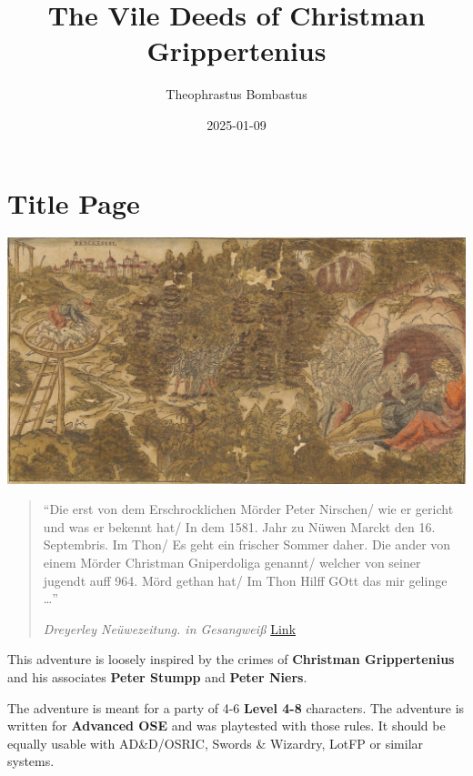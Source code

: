 \documentclass[
]{book}
\title{The Vile Deeds of Christman Grippertenius}
\author{Theophrastus Bombastus}
\date{2025-01-09}
\begin{document}
\maketitle

{
\setcounter{tocdepth}{1}
\tableofcontents
}
\chapter*{Title Page}\label{title-page}

\begin{center}\includegraphics[width=1.2\linewidth]{graphics/wiki_Christeman} \end{center}

\begin{quote}
``Die erst von dem Erschrocklichen Mörder Peter Nirschen/ wie er gericht und was er bekennt hat/ In dem 1581. Jahr zu Nüwen Marckt den 16. Septembris. Im Thon/ Es geht ein frischer Sommer daher. Die ander von einem Mörder Christman Gniperdoliga genannt/ welcher von seiner jugendt auff 964. Mörd gethan hat/ Im Thon Hilff GOtt das mir gelinge \ldots{}''

\emph{Dreyerley Neüwezeitung. in Gesangweiß} \href{https://collections.thulb.uni-jena.de/receive/HisBest_cbu_00033564}{Link}
\end{quote}

This adventure is loosely inspired by the crimes of \textbf{Christman Grippertenius} and his associates \textbf{Peter Stumpp} and \textbf{Peter Niers}.

The adventure is meant for a party of 4-6 \textbf{Level 4-8} characters. The adventure is written for \textbf{Advanced OSE} and was playtested with those rules. It should be equally usable with AD\&D/OSRIC, Swords \& Wizardry, LotFP or similar systems.
\end{document}
